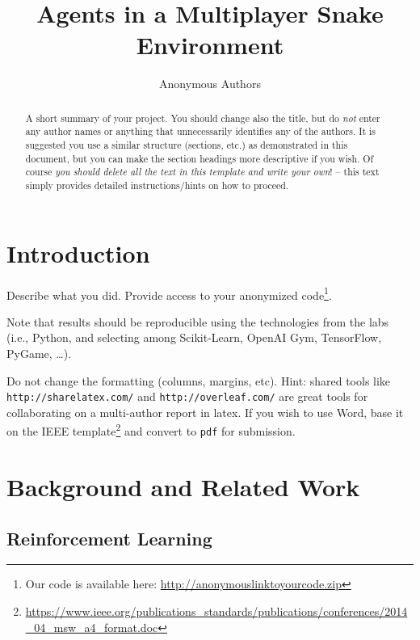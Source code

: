 \documentclass[journal, a4paper]{IEEEtran}
\begin{document}
\title{Agents in a Multiplayer Snake Environment}
\author{Anonymous Authors}
\maketitle

\begin{abstract}
	A short summary of your project. You should change also the title, but do \emph{not} enter any author names or anything that unnecessarily identifies any of the authors. It is suggested you use a similar structure (sections, etc.) as demonstrated in this document, but you can make the section headings more descriptive if you wish. Of course \emph{you should delete all the text in this template and write your own}! -- this text simply provides detailed instructions/hints on how to proceed.

\end{abstract}

\section{Introduction}

Describe what you did. Provide access to your anonymized code\footnote{Our code is available here: \url{http://anonymouslinktoyourcode.zip}}.

Note that results should be reproducible using the technologies from the labs (i.e., Python, and selecting among Scikit-Learn, OpenAI Gym, TensorFlow, PyGame, \ldots).

Do not change the formatting (columns, margins, etc). Hint: shared tools like \texttt{http://sharelatex.com/} and \texttt{http://overleaf.com/} are great tools for collaborating on a multi-author report in latex. If you wish to use Word, base it on the IEEE template\footnote{\url{https://www.ieee.org/publications_standards/publications/conferences/2014_04_msw_a4_format.doc}} and convert to \texttt{pdf} for submission. 

\section{Background and Related Work}

\subsection{Reinforcement Learning}
\end{document}
